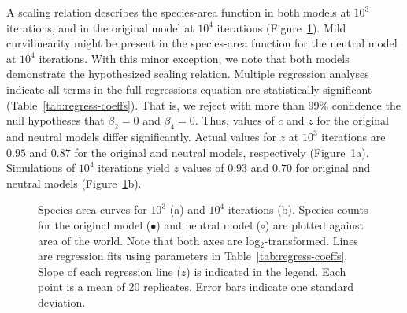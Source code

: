 A scaling relation
describes the species-area function in both models at $10^3$
iterations, and in the original model at $10^4$ iterations
(Figure~\ref{fig:species-area-curves}).  Mild curvilinearity might
be present in the species-area function for the neutral model at
$10^4$ iterations.  With this minor exception, we note that both
models demonstrate the hypothesized scaling relation.  Multiple
regression analyses indicate all terms in the full regressions
equation are statistically significant
(Table~\ref{tab:regress-coeffs}).  That is, we reject with more than
99\% confidence the null hypotheses that $\beta _2 = 0$ and $\beta _4
= 0$.  Thus, values of $c$ and $z$ for the original and neutral models
differ significantly.  Actual values for $z$ at $10^3$ iterations are
$0.95$ and $0.87$ for the original and neutral models, respectively 
(Figure~\ref{fig:species-area-curves}a).
Simulations of $10^4$ iterations yield $z$ values of $0.93$ and $0.70$ 
for original and neutral models (Figure~\ref{fig:species-area-curves}b).  

\begin{figure}[t!]
\begin{center}
\leavevmode
\ifepsf
{}
\else
\fi
\caption{Species-area curves for $10^3$ (a) and $10^4$ iterations
  (b).  Species counts for the original model ($\bullet$) and
  neutral model ($\circ$) are plotted against area of the world.  Note
  that both axes are log$_2$-transformed.  Lines are regression fits
  using parameters in Table~\protect\ref{tab:regress-coeffs}.  Slope
  of each regression line ($z$) is indicated in the legend.  Each
  point is a mean of 20 replicates.  Error bars indicate one standard
  deviation.
\label{fig:species-area-curves}}
\end{center}
\end{figure}
